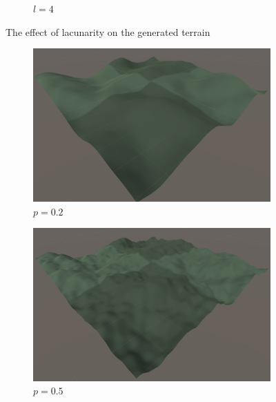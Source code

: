 \documentclass[12pt]{article}
\begin{document}
\begin{figure}[ht]
\begin{subfigure}{0.3\textwidth}
        \caption{$l=4$}
        \label{fig:lacunarity4}
    \end{subfigure}
    \caption{The effect of lacunarity on the generated terrain}
    \label{fig:lacunarity}
\end{figure}

\begin{figure}[ht]
    \centering
    \begin{subfigure}{0.3\textwidth}
        \centering
        \includegraphics[width=\linewidth]{persistance0.2.png}
        \caption{$p=0.2$}
        \label{fig:persistence0.2}
    \end{subfigure}
    \hfill
    \begin{subfigure}{0.3\textwidth}
        \centering
        \includegraphics[width=\linewidth]{persistance0.5.png}
        \caption{$p=0.5$}
        \label{fig:persistence0.5}
    \end{subfigure}
    \hfill
    \begin{subfigure}{0.3\textwidth}

\end{subfigure}
\end{figure}
\end{document}
